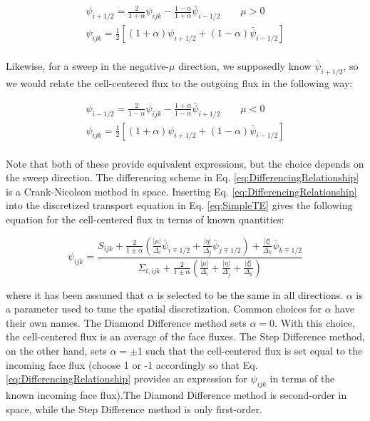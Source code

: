 \documentclass[10pt]{article}
\begin{document}
\begin{flushleft}
\begin{equation}
\begin{aligned}
\psi_{i+1/2}=\frac{2}{1+\alpha}\psi_{ijk}-\frac{1-\alpha}{1+\alpha}\bar{\psi}_{i-1/2}\quad\quad\mu >0\\
\psi_{ijk}=\frac{1}{2}\left\lbrack(1+\alpha)\psi_{i+1/2}+(1-\alpha)\bar{\psi}_{i-1/2}\right\rbrack\\
\end{aligned}
\end{equation}

Likewise, for a sweep in the negative-\(\mu\) direction, we supposedly know \(\bar{\psi}_{i+1/2}\), so we would relate the cell-centered flux to the outgoing flux in the following way:

\begin{equation}
\begin{aligned}
\psi_{i-1/2}=\frac{2}{1-\alpha}\psi_{ijk}-\frac{1+\alpha}{1-\alpha}\bar{\psi}_{i+1/2}\quad\quad\mu <0\\
\psi_{ijk}=\frac{1}{2}\left\lbrack(1+\alpha)\psi_{i+1/2}+(1-\alpha)\bar{\psi}_{i-1/2}\right\rbrack\\
\end{aligned}
\end{equation}

Note that both of these provide equivalent expressions, but the choice depends on the sweep direction. The differencing scheme in Eq. \eqref{eq:DifferencingRelationship} is a Crank-Nicolson method in space. Inserting Eq. \eqref{eq:DifferencingRelationship} into the discretized transport equation in Eq. \eqref{eq:SimpleTE} gives the following equation for the cell-centered flux in terms of known quantities:

\begin{equation}
\label{eq:psi_ijk}
\psi_{ijk}=\frac{S_{ijk}+\frac{2}{1\pm\alpha}\left(\frac{|\mu|}{\Delta_i}\bar{\psi}_{i\mp1/2}+\frac{|\eta|}{\Delta_j}\bar{\psi}_{j\mp1/2}\right)+\frac{|\xi|}{\Delta_k}\bar{\psi}_{k\mp1/2}}{\Sigma_{t,ijk}+\frac{2}{1\pm\alpha}\left(\frac{|\mu|}{\Delta_i}+\frac{|\eta|}{\Delta_j}+\frac{|\xi|}{\Delta_k}\right)}
\end{equation}

where it has been assumed that \(\alpha\) is selected to be the same in all directions. \(\alpha\) is a parameter used to tune the spatial discretization. Common choices for \(\alpha\) have their own names. The Diamond Difference method sets \(\alpha=0\). With this choice, the cell-centered flux is an average of the face fluxes. The Step Difference method, on the other hand, sets \(\alpha=\pm1\) such that the cell-centered flux is set equal to the incoming face flux (choose 1 or -1 accordingly so that Eq. \eqref{eq:DifferencingRelationship} provides an expression for \(\psi_{ijk}\) in terms of the known incoming face flux).The Diamond Difference method is second-order in space, while the Step Difference method is only first-order. 


\end{flushleft}
\end{document}
